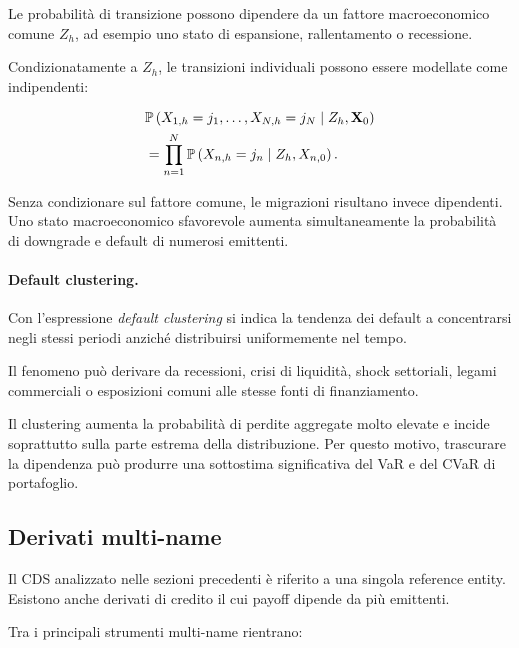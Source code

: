 Le probabilit\`{a} di transizione possono dipendere da un fattore
macroeconomico comune $Z_h$, ad esempio uno stato di espansione,
rallentamento o recessione.

Condizionatamente a $Z_h$, le transizioni individuali possono essere
modellate come indipendenti:

\[
\begin{split}
&
\mathbb{P}
\left(
X_{1,h}=j_1,\ldots,X_{N,h}=j_N
\mid
Z_h,\mathbf{X}_0
\right)
\\
&=
\prod_{n=1}^{N}
\mathbb{P}
\left(
X_{n,h}=j_n
\mid
Z_h,X_{n,0}
\right).
\end{split}
\]

Senza condizionare sul fattore comune, le migrazioni risultano invece
dipendenti. Uno stato macroeconomico sfavorevole aumenta
simultaneamente la probabilit\`{a} di downgrade e default di numerosi
emittenti.

\paragraph{Default clustering.}

Con l'espressione \emph{default clustering} si indica la tendenza dei
default a concentrarsi negli stessi periodi anzich\'{e} distribuirsi
uniformemente nel tempo.

Il fenomeno pu\`{o} derivare da recessioni, crisi di liquidit\`{a},
shock settoriali, legami commerciali o esposizioni comuni alle stesse
fonti di finanziamento.

Il clustering aumenta la probabilit\`{a} di perdite aggregate molto
elevate e incide soprattutto sulla parte estrema della distribuzione.
Per questo motivo, trascurare la dipendenza pu\`{o} produrre una
sottostima significativa del VaR e del CVaR di portafoglio.

\subsection{Derivati multi-name}

\label{subsec:cap9-derivati-multiname}

Il CDS analizzato nelle sezioni precedenti \`{e} riferito a una singola
reference entity. Esistono anche derivati di credito il cui payoff
dipende da pi\`{u} emittenti.

Tra i principali strumenti multi-name rientrano:

